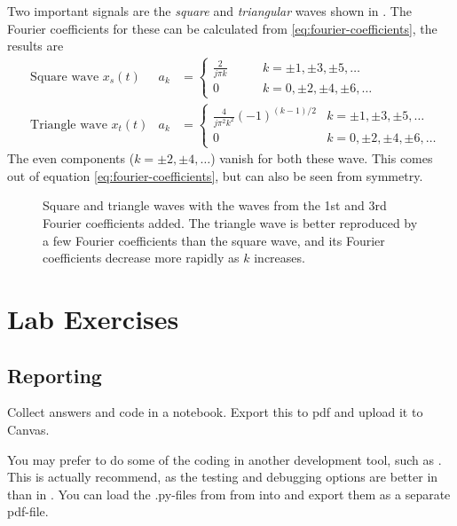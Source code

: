 Two important signals are the \emph{square} and \emph{triangular} waves shown in . The Fourier coefficients for these can be calculated from \eqref{eq:fourier-coefficients}, the results are 
\begin{subequations}
\begin{align}
	& \text{Square wave } x_s(t)& a_k&= \begin{cases}
		\frac{2}{j \pi k }	\qquad & k = \pm 1, \pm 3, \pm 5, \ldots \\
		0    					& k = 0, \pm 2, \pm 4, \pm 6, \ldots
	\end{cases} 
	\label{eq:square_wave_coefficients} \\
	& \text{Triangle wave }  x_t(t)& a_k&= \begin{cases}
	\frac{4}{j \pi^2 k^2 }(-1)^{(k-1)/2}	& k = \pm 1, \pm 3, \pm 5, \ldots \\
	0    					& k = 0, \pm 2, \pm 4, \pm 6, \ldots
	\label{eq:triangle_wave_coefficients} 
\end{cases}
\end{align}
\end{subequations}
The even components ($k=\pm2, \pm4 , \ldots$) vanish for both these wave. This comes out of  equation \eqref{eq:fourier-coefficients}, but can also be seen from symmetry. 

\begin{center}
\begin{figure}[!h]
	\caption{Square and triangle waves with the waves from the 1st and 3rd Fourier coefficients added. The triangle wave is  better reproduced by a few Fourier coefficients than the square wave, and its Fourier coefficients decrease more rapidly as $k$ increases.}
	\label{fig:square_triangle}
\end{figure}
\end{center}


\section{Lab Exercises}

\subsection*{Reporting}
Collect answers and code in a \jupyterlab notebook. Export this to pdf and upload it to Canvas.

You may prefer to do some of the coding in another development tool, such as \spyder. This is actually  recommend, as the testing and debugging options are better in \spyder than in \jupyterlab. You can load the .py-files from from \spyder into \jupyterlab and export them as a separate pdf-file.

